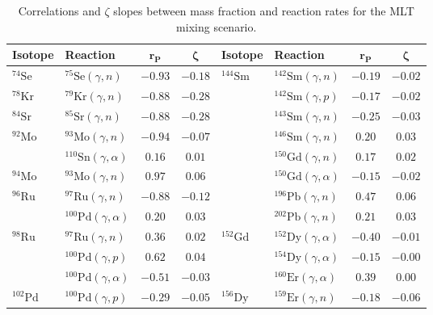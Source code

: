 \begin{table}
\caption{Correlations and $\zeta$ slopes between mass fraction and reaction rates for the MLT mixing scenario.
\label{tab:mlt_corr}}
\scriptsize
    \begin{tabular}{llcc|llcc}
    \toprule
    \textbf{Isotope} & \textbf{Reaction} & $\mathbf{r_\mathrm{\mathbf{P}}}$ & $\mathbf{\zeta}$ & \textbf{Isotope} & \textbf{Reaction} & $\mathbf{r_\mathrm{\mathbf{P}}}$ & $\mathbf{\zeta}$ \\
    \toprule
    $^{74}\mathrm{Se}$ & $^{75}\mathrm{Se}(\gamma,n)$ & $-0.93$ & $-0.18$ & $^{144}\mathrm{Sm}$ & $^{142}\mathrm{Sm}(\gamma,n)$ & $-0.19$ & $-0.02$ \\ 
    $^{78}\mathrm{Kr}$ & $^{79}\mathrm{Kr}(\gamma,n)$ & $-0.88$ & $-0.28$ & $ $ & $^{142}\mathrm{Sm}(\gamma,p)$ & $-0.17$ & $-0.02$ \\ 
    $^{84}\mathrm{Sr}$ & $^{85}\mathrm{Sr}(\gamma,n)$ & $-0.88$ & $-0.28$ & $ $ & $^{143}\mathrm{Sm}(\gamma,n)$ & $-0.25$ & $-0.03$ \\ 
    $^{92}\mathrm{Mo}$ & $^{93}\mathrm{Mo}(\gamma,n)$ & $-0.94$ & $-0.07$ & $ $ & $^{146}\mathrm{Sm}(\gamma,n)$ & $0.20$ & $0.03$ \\ 
    $ $ & $^{110}\mathrm{Sn}(\gamma,\alpha)$ & $0.16$ & $0.01$ & $ $ & $^{150}\mathrm{Gd}(\gamma,n)$ & $0.17$ & $0.02$ \\ 
    $^{94}\mathrm{Mo}$ & $^{93}\mathrm{Mo}(\gamma,n)$ & $0.97$ & $0.06$ & $ $ & $^{150}\mathrm{Gd}(\gamma,\alpha)$ & $-0.15$ & $-0.02$ \\ 
    $^{96}\mathrm{Ru}$ & $^{97}\mathrm{Ru}(\gamma,n)$ & $-0.88$ & $-0.12$ & $ $ & $^{196}\mathrm{Pb}(\gamma,n)$ & $0.47$ & $0.06$ \\ 
    $ $ & $^{100}\mathrm{Pd}(\gamma,\alpha)$ & $0.20$ & $0.03$ & $ $ & $^{202}\mathrm{Pb}(\gamma,n)$ & $0.21$ & $0.03$ \\ 
    $^{98}\mathrm{Ru}$ & $^{97}\mathrm{Ru}(\gamma,n)$ & $0.36$ & $0.02$ & $^{152}\mathrm{Gd}$ & $^{152}\mathrm{Dy}(\gamma,\alpha)$ & $-0.40$ & $-0.01$ \\ 
    $ $ & $^{100}\mathrm{Pd}(\gamma,p)$ & $0.62$ & $0.04$ & $ $ & $^{154}\mathrm{Dy}(\gamma,\alpha)$ & $-0.15$ & $-0.00$ \\ 
    $ $ & $^{100}\mathrm{Pd}(\gamma,\alpha)$ & $-0.51$ & $-0.03$ & $ $ & $^{160}\mathrm{Er}(\gamma,\alpha)$ & $0.39$ & $0.00$ \\ 
    $^{102}\mathrm{Pd}$ & $^{100}\mathrm{Pd}(\gamma,p)$ & $-0.29$ & $-0.05$ & $^{156}\mathrm{Dy}$ & $^{159}\mathrm{Er}(\gamma,n)$ & $-0.18$ & $-0.06$ \\ 

\end{tabular}
\end{table}
